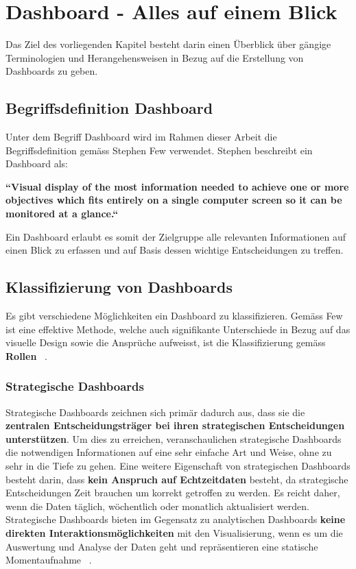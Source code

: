 \section{Dashboard - Alles auf einem Blick}
Das Ziel des vorliegenden Kapitel besteht darin einen Überblick über gängige Terminologien und Herangehensweisen in Bezug auf die Erstellung von Dashboards zu geben. 

\subsection{Begriffsdefinition Dashboard} \label{ch:definition_dashboard}
Unter dem Begriff Dashboard wird im Rahmen dieser Arbeit die Begriffsdefinition gemäss Stephen Few verwendet. Stephen beschreibt ein Dashboard als:

\begin{center}
\textbf{``Visual display of the most information needed to achieve one or more objectives which fits entirely on a single computer screen so it can be monitored at a glance.``} ~\citep[S. 34]{information_dashboard_design}  
\end{center}

Ein Dashboard erlaubt es somit der Zielgruppe alle relevanten Informationen auf einen Blick zu erfassen und auf Basis dessen wichtige Entscheidungen zu treffen.

\subsection{Klassifizierung von Dashboards} \label{ch:classification_of_dashboards}
Es gibt verschiedene Möglichkeiten ein Dashboard zu klassifizieren. Gemäss Few ist eine effektive Methode, welche auch signifikante Unterschiede in Bezug auf das visuelle Design sowie die Ansprüche aufweisst, ist die Klassifizierung gemäss \textbf{Rollen} ~\citep[S. 40]{information_dashboard_design}.

\subsubsection{Strategische Dashboards}
Strategische Dashboards zeichnen sich primär dadurch aus, dass sie die \textbf{zentralen Entscheidungsträger bei ihren strategischen Entscheidungen unterstützen}. Um dies zu erreichen, veranschaulichen strategische Dashboards die notwendigen Informationen auf eine sehr einfache Art und Weise, ohne zu sehr in die Tiefe zu gehen. Eine weitere Eigenschaft von strategischen Dashboards besteht darin, dass \textbf{kein Anspruch auf Echtzeitdaten} besteht, da strategische Entscheidungen Zeit brauchen um korrekt getroffen zu werden. Es reicht daher, wenn die Daten täglich, wöchentlich oder monatlich aktualisiert werden. Strategische Dashboards bieten im Gegensatz zu analytischen Dashboards \textbf{keine direkten Interaktionsmöglichkeiten} mit den Visualisierung, wenn es um die Auswertung und Analyse der Daten geht und repräsentieren eine statische Momentaufnahme ~\citep[S. 41]{information_dashboard_design}.


